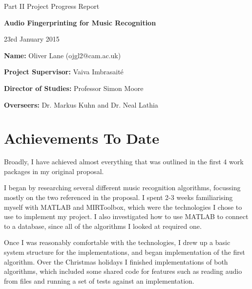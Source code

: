 \documentclass[12pt]{article}
\begin{document}
\thispagestyle{empty}

\medskip
{}
\medskip
{}

\vfil

\centerline{\large Part II Project Progress Report}
\vspace{0.4in}
\centerline{\Large\bf Audio Fingerprinting for Music Recognition}
\vspace{0.3in}
\centerline{\large 23rd January 2015}

\vfil

{\bf Name:} Oliver Lane (ojgl2@cam.ac.uk)

\vspace{0.2in}

{\bf Project Supervisor:} Vaiva Imbrasait\'{e}

\vspace{0.2in}

{\bf Director of Studies:} Professor Simon Moore

\vspace{0.2in}

{\bf Overseers:} Dr. Markus Kuhn and Dr. Neal Lathia

\vfil
\eject

\cleardoublepage
\setcounter{page}{1}

\section*{Achievements To Date}

Broadly, I have achieved almost everything that was outlined in the first 4 work packages in my original proposal.

I began by researching several different music recognition algorithms, focussing mostly on the two referenced in the proposal. I spent 2-3 weeks familiarising myself with MATLAB and MIRToolbox, which were the technologies I chose to use to implement my project. I also investigated how to use MATLAB to connect to a database, since all of the algorithms I looked at required one.

Once I was reasonably comfortable with the technologies, I drew up a basic system structure for the implementations, and began implementation of the first algorithm. Over the Christmas holidays I finished implementations of both algorithms, which included some shared code for features such as reading audio from files and running a set of tests against an implementation.
\end{document}
